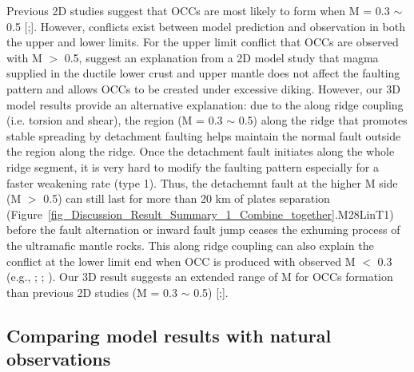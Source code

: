 \documentclass[draft,gc]{agutex}
\begin{document}
\begin{article}
Previous 2D studies suggest that OCCs are most likely to form when M = 0.3 $\sim$ 0.5 [\citealp{Buck2005};\citealp{Tucholke2008}]. However, conflicts exist between model prediction and observation in both the upper and lower limits. For the upper limit conflict that OCCs are observed with M $>$ 0.5, \citet{Olive2010} suggest an explanation from a 2D model study that magma supplied in the ductile lower crust and upper mantle does not affect the faulting pattern and allows OCCs to be created under excessive diking. However, our 3D model results provide an alternative explanation: due to the along ridge coupling (i.e. torsion and shear), the region (M = 0.3 $\sim$ 0.5) along the ridge that promotes stable spreading by detachment faulting helps maintain the normal fault outside the region along the ridge. Once the detachment fault initiates along the whole ridge segment, it is very hard to modify the faulting pattern especially for a faster weakening rate (type 1). Thus, the detachemnt fault at the higher M side (M $>$ 0.5) can still last for more than 20 km of plates separation (Figure~\ref{fig_Discussion_Result_Summary_1_Combine_together}.M28LinT1) before the fault alternation or inward fault jump ceases the exhuming process of the ultramafic mantle rocks. This along ridge coupling can also explain the conflict at the lower limit end when OCC is produced with observed M $<$ 0.3 (e.g., \citealp{Dick2008}; \citealp{Grimes2008}; \citealp{Baines2008}). Our 3D result suggests an extended range of M for OCCs formation than previous 2D studies (M = 0.3 $\sim$ 0.5) [\citealp{Buck2005};\citealp{Tucholke2008}].

\subsection{Comparing model results with natural observations}

\end{article}
\end{document}
